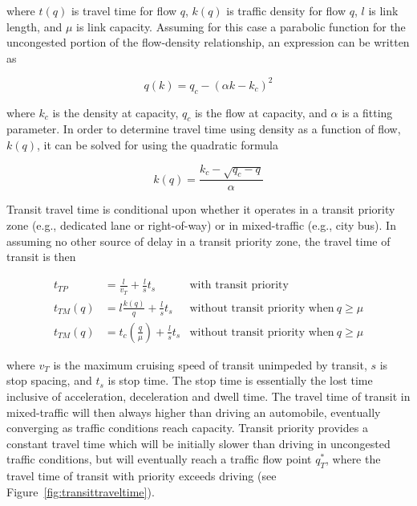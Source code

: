 \documentclass{article}
\begin{document}
\noindent where $t(q)$ is travel time for flow $q$, $k(q)$ is traffic density for flow $q$, $l$ is link length, and $\mu$ is link capacity. Assuming for this case a parabolic function for the uncongested portion of the flow-density relationship, an expression can be written as

\begin{equation}
    q(k) = q_c - (\alpha k - k_c)^2
\end{equation}

\noindent where $k_c$ is the density at capacity, $q_c$ is the flow at capacity, and $\alpha$ is a fitting parameter. In order to determine travel time using density as a function of flow, $k(q)$, it can be solved for using the quadratic formula

\begin{equation}
    k(q) = \frac{k_c - \sqrt{q_c - q}}{\alpha}
\end{equation}

Transit travel time is conditional upon whether it operates in a transit priority zone (e.g., dedicated lane or right-of-way) or in mixed-traffic (e.g., city bus). In assuming no other source of delay in a transit priority zone, the travel time of transit is then

\begin{subequations}
\begin{align}
    t_{TP} & = \frac{l}{v_T} + \frac{l}{s}t_s  & \text{with transit priority} \\
    t_{TM}(q) & = l\frac{k(q)}{q} + \frac{l}{s}t_s  & \text{without transit priority when}~q \geq \mu\\
    t_{TM}(q) & = t_c \left(\frac{q}{\mu}\right) + \frac{l}{s}t_s & \text{without transit priority when}~q \geq \mu
\end{align}
\end{subequations}

\noindent where $v_T$ is the maximum cruising speed of transit unimpeded by transit, $s$ is stop spacing, and $t_s$ is stop time. The stop time is essentially the lost time inclusive of acceleration, deceleration and dwell time. The travel time of transit in mixed-traffic will then always higher than driving an automobile, eventually converging as traffic conditions reach capacity. Transit priority provides a constant travel time which will be initially slower than driving in uncongested traffic conditions, but will eventually reach a traffic flow point $q^*_T$, where the travel time of transit with priority exceeds driving (see Figure~\ref{fig:transittraveltime}). 
\end{document}
